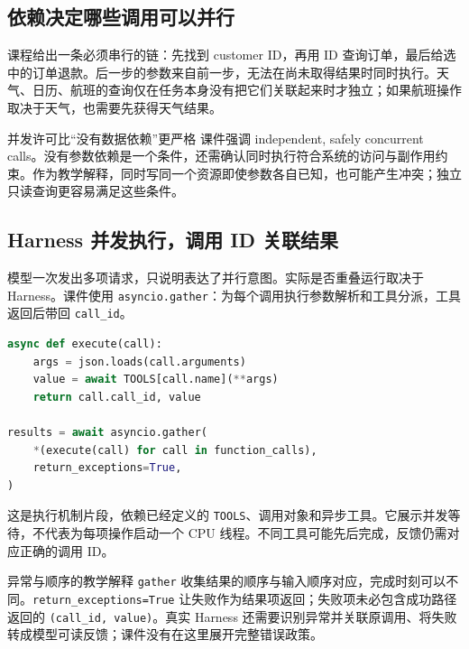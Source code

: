 \documentclass[11pt,a4paper]{article}
\begin{document}
\subsection{依赖决定哪些调用可以并行}
课程给出一条必须串行的链：先找到 customer ID，再用 ID 查询订单，最后给选中的订单退款。后一步的参数来自前一步，无法在尚未取得结果时同时执行。天气、日历、航班的查询仅在任务本身没有把它们关联起来时才独立；如果航班操作取决于天气，也需要先获得天气结果。

\begin{importantbox}{并发许可比“没有数据依赖”更严格}
课件强调 independent, safely concurrent calls。没有参数依赖是一个条件，还需确认同时执行符合系统的访问与副作用约束。作为教学解释，同时写同一个资源即使参数各自已知，也可能产生冲突；独立只读查询更容易满足这些条件。
\end{importantbox}

\subsection{Harness 并发执行，调用 ID 关联结果}
模型一次发出多项请求，只说明表达了并行意图。实际是否重叠运行取决于 Harness。课件使用 \texttt{asyncio.gather}：为每个调用执行参数解析和工具分派，工具返回后带回 \texttt{call\_id}。

\noindent\begin{minipage}{\textwidth}
\begin{lstlisting}[language=Python,caption={课件节选：并发执行异步工具，并保留结果对应的调用 ID}]
async def execute(call):
    args = json.loads(call.arguments)
    value = await TOOLS[call.name](**args)
    return call.call_id, value

results = await asyncio.gather(
    *(execute(call) for call in function_calls),
    return_exceptions=True,
)
\end{lstlisting}
\end{minipage}

这是执行机制片段，依赖已经定义的 \texttt{TOOLS}、调用对象和异步工具。它展示并发等待，不代表为每项操作启动一个 CPU 线程。不同工具可能先后完成，反馈仍需对应正确的调用 ID。

\begin{knowledgebox}{异常与顺序的教学解释}
\texttt{gather} 收集结果的顺序与输入顺序对应，完成时刻可以不同。\texttt{return\_exceptions=True} 让失败作为结果项返回；失败项未必包含成功路径返回的 \texttt{(call\_id, value)}。真实 Harness 还需要识别异常并关联原调用、将失败转成模型可读反馈；课件没有在这里展开完整错误政策。
\end{knowledgebox}
\end{document}
